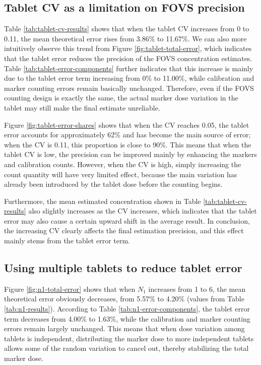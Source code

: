 \documentclass[
  12pt,
]{article}
\begin{document}
\subsection{Tablet CV as a limitation on FOVS
precision}\label{tablet-cv-as-a-limitation-on-fovs-precision}

Table \ref{tab:tablet-cv-results} shows that when the tablet CV
increases from 0 to 0.11, the mean theoretical error rises from 3.86\%
to 11.67\%. We can also more intuitively observe this trend from Figure
\ref{fig:tablet-total-error}, which indicates that the tablet error
reduces the precision of the FOVS concentration estimates. Table
\ref{tab:tablet-error-components} further indicates that this increase
is mainly due to the tablet error term increasing from 0\% to 11.00\%,
while calibration and marker counting errors remain basically unchanged.
Therefore, even if the FOVS counting design is exactly the same, the
actual marker dose variation in the tablet may still make the final
estimate unreliable.

Figure \ref{fig:tablet-error-shares} shows that when the CV reaches
0.05, the tablet error accounts for approximately 62\% and has become
the main source of error; when the CV is 0.11, this proportion is close
to 90\%. This means that when the tablet CV is low, the precision can be
improved mainly by enhancing the markers and calibration counts.
However, when the CV is high, simply increasing the count quantity will
have very limited effect, because the main variation has already been
introduced by the tablet dose before the counting begins.

Furthermore, the mean estimated concentration shown in Table
\ref{tab:tablet-cv-results} also slightly increases as the CV increases,
which indicates that the tablet error may also cause a certain upward
shift in the average result. In conclusion, the increasing CV clearly
affects the final estimation precision, and this effect mainly stems
from the tablet error term.

\subsection{Using multiple tablets to reduce tablet
error}\label{using-multiple-tablets-to-reduce-tablet-error}

Figure \ref{fig:n1-total-error} shows that when \(N_1\) increases from 1
to 6, the mean theoretical error obviously decreases, from 5.57\% to
4.20\% (values from Table \ref{tab:n1-results}). According to Table
\ref{tab:n1-error-components}, the tablet error term decreases from
4.00\% to 1.63\%, while the calibration and marker counting errors
remain largely unchanged. This means that when dose variation among
tablets is independent, distributing the marker dose to more independent
tablets allows some of the random variation to cancel out, thereby
stabilizing the total marker dose.
\end{document}
